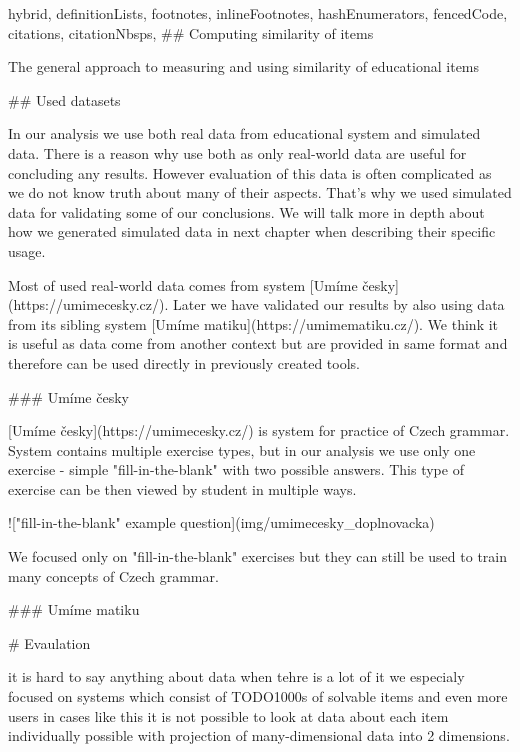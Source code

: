 \documentclass[
  digital, %
  table,   %
  nolof,     %
  nolot,     %
  nocover
]{fithesis3}
\begin{document}
\begin{markdown*}{%
  hybrid,
  definitionLists,
  footnotes,
  inlineFootnotes,
  hashEnumerators,
  fencedCode,
  citations,
  citationNbsps,
}
## Computing similarity of items

The general approach to measuring and using similarity of educational items

## Used datasets


In our analysis we use both real data from educational system and simulated data. There is a reason why use both as only real-world data are useful for concluding any results. However evaluation of this data is often complicated as we do not know truth about many of their aspects. That's why we used simulated data for validating some of our conclusions. We will talk more in depth about how we generated simulated data in next chapter when describing their specific usage.

Most of used real-world data comes from system [Umíme česky](https://umimecesky.cz/). Later we have validated our results by also using data from its sibling system [Umíme matiku](https://umimematiku.cz/). We think it is useful as data come from another context but are provided in same format and therefore can be used directly in previously created tools.

### Umíme česky

[Umíme česky](https://umimecesky.cz/) is system for practice of Czech grammar. System contains multiple exercise types, but in our analysis we use only one exercise - simple "fill-in-the-blank" with two possible answers. This type of exercise can be then viewed by student in multiple ways.

!["fill-in-the-blank" example question](img/umimecesky_doplnovacka)

We focused only on "fill-in-the-blank" exercises but they can still be used to train many concepts of Czech grammar.

### Umíme matiku


# Evaulation




it is hard to say anything about data when tehre is a lot of it
we especialy focused on systems which consist of TODO1000s of solvable items and even more users
in cases like this it is not possible to look at data about each item individually
possible with projection of many-dimensional data into 2 dimensions.


\end{markdown*}
\end{document}
